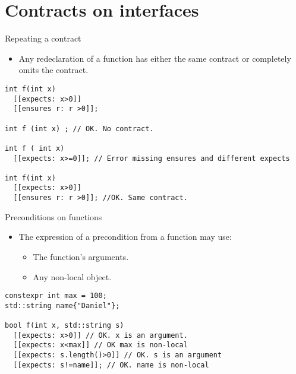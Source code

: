 \section{Contracts on interfaces}

\begin{frame}[t,fragile]{Repeating a contract}
\begin{itemize}
  \item Any redeclaration of a function has either the same contract or
completely omits the contract.
\end{itemize}
\vfill\pause
\begin{lstlisting}
int f(int x)
  [[expects: x>0]]
  [[ensures r: r >0]];

int f (int x) ; // OK. No contract.

int f ( int x)
  [[expects: x>=0]]; // Error missing ensures and different expects

int f(int x)
  [[expects: x>0]]
  [[ensures r: r >0]]; //OK. Same contract.
\end{lstlisting}
\end{frame}

\begin{frame}[t,fragile]{Preconditions on functions}
\begin{itemize}
  \item The expression of a precondition from a function may use:
    \begin{itemize}
      \item The function’s arguments.
      \item Any non-local object. 
    \end{itemize}
\end{itemize}
\begin{lstlisting}
constexpr int max = 100;
std::string name{"Daniel"};

bool f(int x, std::string s)
  [[expects: x>0]] // OK. x is an argument.
  [[expects: x<max]] // OK max is non-local
  [[expects: s.length()>0]] // OK. s is an argument
  [[expects: s!=name]]; // OK. name is non-local
\end{lstlisting}
\end{frame}


